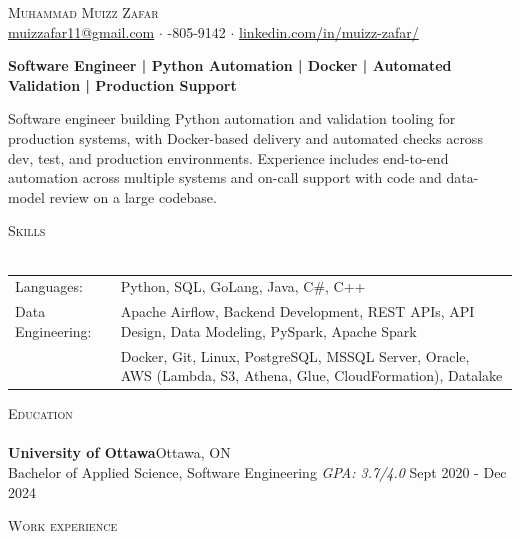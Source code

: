 \documentclass[a4paper]{article}
\newcommand{\lineunder} {
    \vspace*{-8pt} \\
    \hspace*{-18pt} \hrulefill \\
}
\newcommand{\header} [1] {
    {\hspace*{-18pt}\vspace*{6pt} \textsc{#1}}
    \vspace*{-6pt} \lineunder
}
\begin{document}
\vspace*{-40pt}

\vspace*{-10pt}
\begin{center}
	{\Huge \scshape {Muhammad Muizz Zafar}}\\
	\faSend \space \href{mailto:muizzafar11@gmail.com}{muizzafar11@gmail.com} $\cdot$ \faPhoneSquare {}-805-9142 $\cdot$ \faLinkedinSquare \space \href{https://www.linkedin.com/in/muizz-zafar/}{linkedin.com/in/muizz-zafar/}
	\\
\end{center}

\vspace{-5pt}
\begin{center}
\textbf{Software Engineer | Python Automation | Docker | Automated Validation | Production Support}
\end{center}
\begin{center}
Software engineer building Python automation and validation tooling for production systems, with Docker-based delivery and automated checks across dev, test, and production environments. Experience includes end-to-end automation across multiple systems and on-call support with code and data-model review on a large codebase.
\end{center}

\header{Skills}
\begin{tabular}{ l l }
	Languages: 
& Python, SQL, GoLang, Java, C\#, C++ \\

Data Engineering: 
& Apache Airflow, Backend Development, REST APIs, API Design, Data Modeling, PySpark, Apache Spark\\
& Docker, Git, Linux, PostgreSQL, MSSQL Server, Oracle, AWS (Lambda, S3, Athena, Glue, CloudFormation), Datalake

\end{tabular}

\header{Education}
\textbf{University of Ottawa}\hfill Ottawa, ON\\
Bachelor of Applied Science, Software Engineering \textit{GPA: 3.7/4.0} \hfill Sept 2020 - Dec 2024\\
\vspace{2mm}

\header{Work experience}
\vspace{1.5mm}
\end{document}
